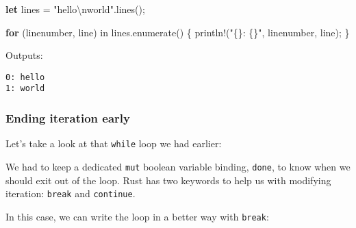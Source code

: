 \documentclass[a4paper,]{book}
\newenvironment{Shaded}{\begin{snugshade}}{\end{snugshade}}
\newcommand{\KeywordTok}[1]{\textcolor[rgb]{0.13,0.29,0.53}{\textbf{{#1}}}}
\newcommand{\DecValTok}[1]{\textcolor[rgb]{0.00,0.00,0.81}{{#1}}}
\newcommand{\CharTok}[1]{\textcolor[rgb]{0.31,0.60,0.02}{{#1}}}
\newcommand{\StringTok}[1]{\textcolor[rgb]{0.31,0.60,0.02}{{#1}}}
\newcommand{\OtherTok}[1]{\textcolor[rgb]{0.56,0.35,0.01}{{#1}}}
\newcommand{\NormalTok}[1]{{#1}}
\begin{document}
\begin{Shaded}
\begin{Highlighting}[]
\KeywordTok{let} \NormalTok{lines = }\StringTok{"hello}\CharTok{\textbackslash{}n}\StringTok{world"}\NormalTok{.lines();}

\KeywordTok{for} \NormalTok{(linenumber, line) in lines.enumerate() \{}
    \OtherTok{println!}\NormalTok{(}\StringTok{"\{\}: \{\}"}\NormalTok{, linenumber, line);}
\NormalTok{\}}
\end{Highlighting}
\end{Shaded}

Outputs:

\begin{verbatim}
0: hello
1: world
\end{verbatim}

\subsubsection{Ending iteration early}\label{ending-iteration-early}

Let's take a look at that \texttt{while} loop we had earlier:

\begin{Shaded}
\end{Shaded}

We had to keep a dedicated \texttt{mut} boolean variable binding,
\texttt{done}, to know when we should exit out of the loop. Rust has two
keywords to help us with modifying iteration: \texttt{break} and
\texttt{continue}.

In this case, we can write the loop in a better way with \texttt{break}:

\begin{Shaded}
\end{Shaded}
\end{document}
